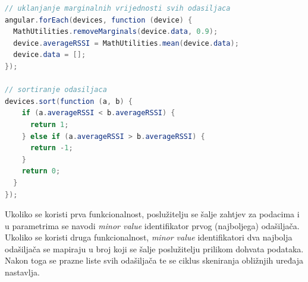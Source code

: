 \begin{lstlisting}[language=java, morekeywords={var,function}]
// uklanjanje marginalnih vrijednosti svih odasiljaca
angular.forEach(devices, function (device) {
  MathUtilities.removeMarginals(device.data, 0.9);
  device.averageRSSI = MathUtilities.mean(device.data);
  device.data = [];
});

// sortiranje odasiljaca
devices.sort(function (a, b) {
    if (a.averageRSSI < b.averageRSSI) {
      return 1;
    } else if (a.averageRSSI > b.averageRSSI) {
      return -1;
    }
    return 0;
  }
});
\end{lstlisting}

Ukoliko se koristi prva funkcionalnost, poslužitelju se šalje zahtjev za podacima i u parametrima se navodi \textit{minor value} identifikator prvog (najboljega) odašiljača. 
Ukoliko se koristi druga funkcionalnost, \textit{minor value} identifikatori dva najbolja odašiljača se mapiraju u broj koji se šalje poslužitelju prilikom dohvata podataka. 
Nakon toga se prazne liste svih odašiljača te se ciklus skeniranja obližnjih uređaja nastavlja.



